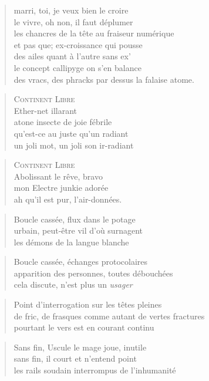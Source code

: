   \begin{verse}
    marri, toi, je veux bien le croire\\
    le vivre, oh non, il faut déplumer\\
    les chancres de la tête au fraiseur numérique\\
    et pas que; ex-croissance qui pousse\\
    des ailes quant à l’autre sans ex’\\
    le concept callipyge on s’en balance\\
    des vracs, des phracks par dessus la falaise atome.
  \end{verse}
  \begin{verse}
    \textsc{Continent Libre}\\
    Ether-net illarant\\
    atone insecte de joie fébrile\\
    qu’est-ce au juste qu’un radiant\\
    un joli mot, un joli son ir-radiant
  \end{verse}
  \begin{verse}
    \textsc{Continent Libre}\\
    Abolissant le rêve, bravo\\
    mon Electre junkie adorée\\
    ah qu’il est pur, l’air-données.
  \end{verse}

  \begin{verse}
    Boucle cassée, flux dans le potage\\
    urbain, peut-être vil d’où surnagent\\
    les démons de la langue blanche
  \end{verse}
  \begin{verse}
    Boucle cassée, échanges protocolaires\\
    apparition des personnes, toutes débouchées\\
    cela discute, n’est plus un \emph{usager}
  \end{verse}
  \begin{verse}
    Point d’interrogation sur les têtes pleines\\
    de fric, de frasques comme autant de vertes fractures\\
    pourtant le vers est en courant continu
  \end{verse}
  \begin{verse}
    Sans fin, Uscule le mage joue, inutile\\
    sans fin, il court et n’entend point\\
    les rails soudain interrompus de l’inhumanité
  \end{verse}

